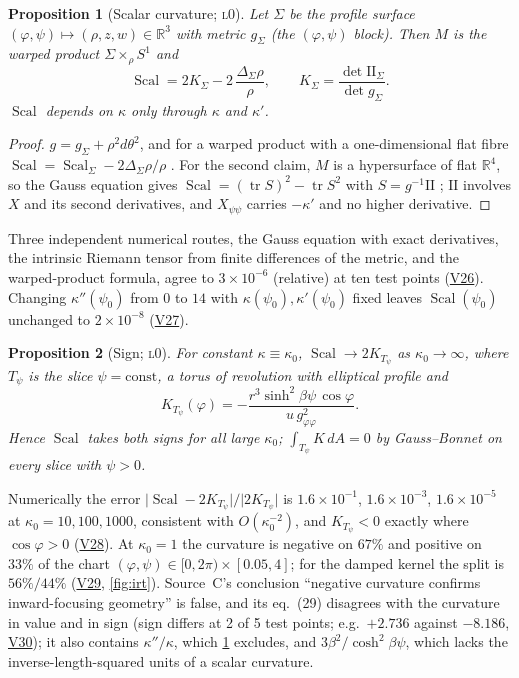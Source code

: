 \documentclass[11pt]{article}
\newtheorem{proposition}{Proposition}
\theoremstyle{definition}
\theoremstyle{remark}
\newcommand{\R}{\mathbb{R}}
\newcommand{\Scal}{\operatorname{Scal}}
\newcommand{\lvl}[1]{\textsc{l}#1}
\newcommand{\V}[1]{\hyperref[app:verify]{\textsf{#1}}}
\begin{document}
\begin{proposition}[Scalar curvature; \lvl{0}]\label{prop:irt-curv}
Let $\Sigma$ be the profile surface $(\varphi,\psi)\mapsto(\rho,z,w)\in\R^3$ with metric $g_\Sigma$ (the $(\varphi,\psi)$ block). Then $M$ is the warped product $\Sigma\times_\rho S^1$ and
\[
\Scal=2K_\Sigma-2\,\frac{\Delta_\Sigma\rho}{\rho},\qquad K_\Sigma=\frac{\det\mathrm{II}_\Sigma}{\det g_\Sigma}.
\]
$\Scal$ depends on $\kappa$ only through $\kappa$ and $\kappa'$.
\end{proposition}
\begin{proof}
$g=g_\Sigma+\rho^2d\theta^2$, and for a warped product with a one-dimensional flat fibre $\Scal=\Scal_\Sigma-2\Delta_\Sigma\rho/\rho$ \cite{ONeill1983}. For the second claim, $M$ is a hypersurface of flat $\R^4$, so the Gauss equation gives $\Scal=(\operatorname{tr}S)^2-\operatorname{tr}S^2$ with $S=g^{-1}\mathrm{II}$ \cite{doCarmo1992}; $\mathrm{II}$ involves $X$ and its second derivatives, and $X_{\psi\psi}$ carries $-\kappa'$ and no higher derivative.
\end{proof}

Three independent numerical routes, the Gauss equation with exact derivatives, the intrinsic Riemann tensor from finite differences of the metric, and the warped-product formula, agree to $3\times10^{-6}$ (relative) at ten test points (\V{V26}). Changing $\kappa''(\psi_0)$ from $0$ to $14$ with $\kappa(\psi_0),\kappa'(\psi_0)$ fixed leaves $\Scal(\psi_0)$ unchanged to $2\times10^{-8}$ (\V{V27}).

\begin{proposition}[Sign; \lvl{0}]\label{prop:irt-sign}
For constant $\kappa\equiv\kappa_0$, $\Scal\to2K_{T_\psi}$ as $\kappa_0\to\infty$, where $T_\psi$ is the slice $\psi=\mathrm{const}$, a torus of revolution with elliptical profile and
\[
K_{T_\psi}(\varphi)=-\frac{r^3\sinh^2\!\beta\psi\,\cos\varphi}{u\,g_{\varphi\varphi}^2}.
\]
Hence $\Scal$ takes both signs for all large $\kappa_0$; $\int_{T_\psi}K\,dA=0$ by Gauss--Bonnet on every slice with $\psi>0$.
\end{proposition}
Numerically the error $\lvert\Scal-2K_{T_\psi}\rvert/\lvert2K_{T_\psi}\rvert$ is $1.6\times10^{-1}$, $1.6\times10^{-3}$, $1.6\times10^{-5}$ at $\kappa_0=10,100,1000$, consistent with $O(\kappa_0^{-2})$, and $K_{T_\psi}<0$ exactly where $\cos\varphi>0$ (\V{V28}). At $\kappa_0=1$ the curvature is negative on $67\%$ and positive on $33\%$ of the chart $(\varphi,\psi)\in[0,2\pi)\times[0.05,4]$; for the damped kernel the split is $56\%/44\%$ (\V{V29}, \cref{fig:irt}). Source~C's conclusion ``negative curvature confirms inward-focusing geometry'' is false, and its eq.~(29) disagrees with the curvature in value and in sign (sign differs at 2 of 5 test points; e.g.\ $+2.736$ against $-8.186$, \V{V30}); it also contains $\kappa''/\kappa$, which \cref{prop:irt-curv} excludes, and $3\beta^2/\cosh^2\!\beta\psi$, which lacks the inverse-length-squared units of a scalar curvature.
\end{document}
